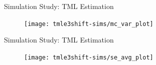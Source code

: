 \documentclass{beamer}
\begin{document}
\begin{frame}[c]{Simulation Study: TML Estimation}

\vspace{-0.45em}
\begin{figure}\label{fig:tmle3shift-mcvar}
  \centering
  \texttt{[image: tmle3shift-sims/mc\_var\_plot]}
\end{figure}

\note{
}

\end{frame}


\begin{frame}[c]{Simulation Study: TML Estimation}

\vspace{-0.45em}
\begin{figure}\label{fig:tmle3shift-avgse}
  \centering
  \texttt{[image: tmle3shift-sims/se\_avg\_plot]}
\end{figure}

\note{
}

\end{frame}

\end{document}
